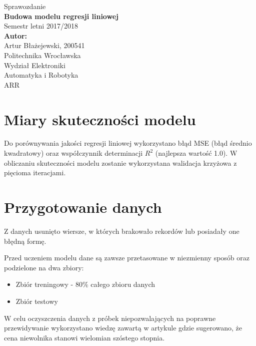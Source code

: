 \documentclass[a4paper,12pt]{article}
\begin{document}
\begin{titlepage}
\begin{center}
\vspace*{1cm}
{ \Large Sprawozdanie }\\[1cm]


{ \large \textbf{Budowa modelu regresji liniowej} }\\
Semestr letni 2017/2018\\[2cm]

\Large
\textbf{Autor:}\\
Artur Błażejewski, 200541\\


\vfill
\Large
Politechnika Wrocławska\\
\large
Wydział Elektroniki\\
Automatyka i Robotyka\\
ARR
\end{center}
\end{titlepage}

\section{Miary skuteczności modelu}
	Do porównywania jakości regresji liniowej wykorzystano błąd MSE (błąd średnio kwadratowy) oraz współczynnik determinacji $R^2$ (najlepsza wartość 1.0). W obliczaniu skuteczności modelu zostanie wykorzystana walidacja krzyżowa z pięcioma iteracjami.

\section{Przygotowanie danych}
	Z danych usunięto wiersze, w których brakowało rekordów lub posiadały one błędną formę.
	
	Przed uczeniem modelu dane są zawsze przetasowane w niezmienny sposób oraz podzielone na dwa zbiory:
	\begin{itemize}
		\item Zbiór treningowy - 80\% całego zbioru danych
		\item Zbiór testowy
	\end{itemize}
	
	W celu oczyszczenia danych z próbek niepozwalających na poprawne przewidywanie wykorzystano wiedzę zawartą w artykule\cite{slave_article} gdzie sugerowano, że cena niewolnika stanowi wielomian szóstego stopnia.
	
\end{document}
